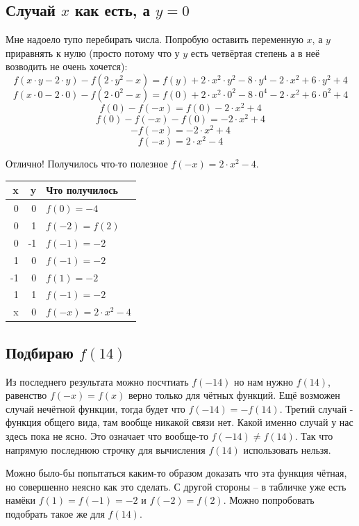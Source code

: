 \documentclass{article}
\begin{document}
\subsection{Случай $x$ как есть, а $y=0$}
Мне надоело тупо перебирать числа. Попробую оставить переменную $x$, а $y$ приравнять к нулю (просто потому что у $y$ есть четвёртая степень а в неё возводить не очень хочется):
$$f(x\cdot{}y-2\cdot{}y)-f(2\cdot{}y^2-x)=f(y)+2\cdot{}x^2\cdot{}y^2-8\cdot{}y^4-2\cdot{}x^2+6\cdot{}y^2+4$$
$$f(x\cdot{}0-2\cdot{}0)-f(2\cdot{}0^2-x)=f(0)+2\cdot{}x^2\cdot{}0^2-8\cdot{}0^4-2\cdot{}x^2+6\cdot{}0^2+4$$
$$f(0)-f(-x)=f(0)-2\cdot{}x^2+4$$
$$f(0)-f(-x)-f(0)=-2\cdot{}x^2+4$$
$$-f(-x)=-2\cdot{}x^2+4$$
$$f(-x)=2\cdot{}x^2-4$$

\begin{samepage}
Отлично! Получилось что-то полезное {\boldmath\color{red}$f(-x)=2\cdot{}x^2-4$}.
\begin{center}
 \begin{tabular}{r r l}
 \hline
 x & y & Что получилось        \\
 \hline
  0 &  0 & $f(0)=-4$           \\
  0 &  1 & $f(-2)=f(2)$        \\
  0 & -1 & $f(-1)=-2$          \\
  1 &  0 & $f(-1)=-2$          \\
 -1 &  0 & $f(1)=-2$           \\
  1 &  1 & $f(-1)=-2$          \\
  x &  0 & $f(-x)=2\cdot{}x^2-4$ \\
  \hline
 \end{tabular}
\end{center}
\end{samepage}

\subsection{Подбираю $f(14)$}
Из последнего результата можно посчтиать $f(-14)$ но нам нужно $f(14)$, равенство $f(-x)=f(x)$ верно только для чётных функций. Ещё возможен случай нечётной функции, тогда будет что $f(-14)=-f(14)$. Третий случай - функция общего вида, там вообще никакой связи нет. Какой именно случай у нас здесь пока не ясно. Это означает что вообще-то $f(-14) \ne{} f(14)$. Так что напрямую последнюю строчку для вычисления $f(14)$ использовать нельзя.

Можно было-бы попытаться каким-то образом доказать что эта функция чётная, но совершенно неясно как это сделать. С другой стороны -- в табличке уже есть намёки $f(1)=f(-1)=-2$ и $f(-2)=f(2)$. Можно попробовать подобрать такое же для $f(14)$.
\end{document}
